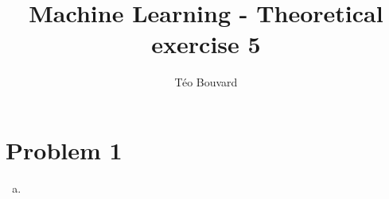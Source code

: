 \documentclass[a4paper, 10pt, twoside]{article}
\begin{document}
\title{Machine Learning - Theoretical exercise 5}
\author{T\'eo Bouvard}
\maketitle

\section*{Problem 1}
\begin{enumerate}[a)]
    \item 
\end{enumerate}
\end{document}
